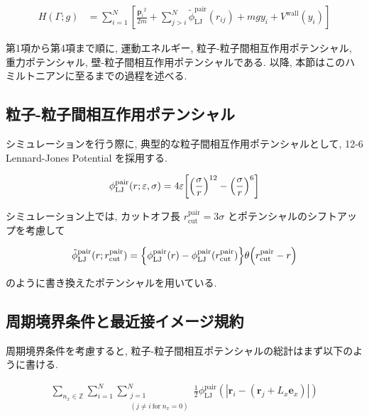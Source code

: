 \begin{align}
  \label{Hamiltonian}
  H(\Gamma; g)
  &= \sum_{i=1}^{N}
  \left[
    \frac{{\bm{p}_i}^2}{2m} 
    + \sum_{j > i}^{N}
      \tilde{\phi}_{\text{LJ}}^{\text{pair}}(r_{ij})
    + mgy_i
    + V^{\text{wall}} (y_i)
  \right] 
\end{align}

第1項から第4項まで順に, 運動エネルギー, 粒子-粒子間相互作用ポテンシャル, 重力ポテンシャル, 壁-粒子間相互作用ポテンシャルである. 以降, 本節はこのハミルトニアンに至るまでの過程を述べる.

\subsection{粒子-粒子間相互作用ポテンシャル}

シミュレーションを行う際に, 典型的な粒子間相互作用ポテンシャルとして, 12-6 Lennard-Jones Potential を採用する.

\begin{align}
  \phi_{\text{LJ}}^{\text{pair}}(r; \varepsilon, \sigma) = 4\varepsilon \qty[\qty(\frac{\sigma}{r})^{12} - \qty(\frac{\sigma}{r})^{6}] 
\end{align}

シミュレーション上では, カットオフ長 $r_{\text{cut}}^{\text{pair}}=3\sigma$ とポテンシャルのシフトアップを考慮して

\begin{align}
  \tilde{\phi}_{\text{LJ}}^{\text{pair}}(r;r_{\text{cut}}^{\text{pair}}) = \qty{\phi_{\text{LJ}}^{\text{pair}}(r) - \phi_{\text{LJ}}^{\text{pair}}(r_{\text{cut}}^{\text{pair}})}\theta \qty(r_{\text{cut}}^{\text{pair}}-r) \\
\end{align}

のように書き換えたポテンシャルを用いている.

\subsection{周期境界条件と最近接イメージ規約}

周期境界条件を考慮すると, 粒子-粒子間相互ポテンシャルの総計はまず以下のように書ける.\cite{MD}

\begin{align}
  \sum_{n_x \in \mathbb{Z}} \sum_{i=1}^{N} \sum_{\substack{j=1 \\ (j \neq i \ \text{for} \ n_{x} = 0)}}^{N} \frac{1}{2} \phi_{\text{LJ}}^{\text{pair}}(|\bm{r}_i -(\bm{r}_j + L_x \bm{e}_x)|) 
\end{align}

